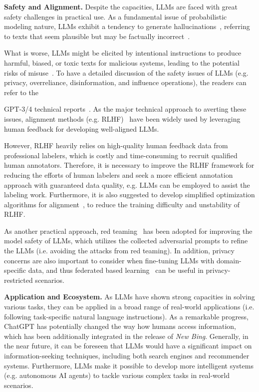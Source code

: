 \textbf{Safety and Alignment.} Despite the capacities, LLMs are faced with great safety challenges in practical use. As a fundamental issue of probabilistic modeling nature, LLMs exhibit a tendency to generate hallucinations~\cite{Bang-arxiv-2023-A}, referring to texts that seem plausible but may be factually incorrect~\cite{OpenAI-OpenAI-2023-GPT-4}.  

What is worse, LLMs might be elicited by intentional instructions to produce harmful, biased, or toxic texts for malicious systems, leading to the potential risks of misuse~\cite{Brown-NeurIPS-2020-Language,Ouyang-arxiv-2022-Training}. To have a detailed  discussion of the safety issues of LLMs (e.g. privacy, overreliance, disinformation, and influence operations), the readers can refer to the {GPT-3/4 technical reports~\cite{OpenAI-OpenAI-2023-GPT-4,Brown-NeurIPS-2020-Language}. As the major technical approach to averting these issues, alignment methods (e.g. RLHF)~\cite{Ouyang-arxiv-2022-Training,Glaese-arxiv-2022-Improving} have been widely used by leveraging human feedback for developing well-aligned LLMs.

However, RLHF heavily relies on high-quality human feedback data from professional labelers, which is costly and time-consuming to recruit qualified human annotators. Therefore, it is necessary to improve the RLHF framework for reducing the efforts of human labelers and seek a more efficient annotation approach with guaranteed data quality,  e.g. LLMs can be employed to assist the labeling work. Furthermore, it is also suggested to develop simplified optimization algorithms for alignment~\cite{Rafailov-arxiv-2023-Direct,Guo-arxiv-2023-Beyond}, to reduce   the training difficulty and unstability of RLHF. 

As another practical approach, red teaming~\cite{Ganguli-arxiv-2022-Red,Perez-EMNLP-2022-Red} has been adopted for improving the model safety of LLMs, which utilizes the collected adversarial prompts to refine the LLMs (i.e. avoiding the attacks from red teaming). In addition, privacy  concerns are also important to consider when fine-tuning LLMs with domain-specific data, and thus federated based learning~\cite{Kuang-2023-arxiv-FederatedScope} can be useful in privacy-restricted scenarios.   

\textbf{Application and Ecosystem.} As LLMs have shown strong capacities  in solving various tasks, they can be applied in a broad range of real-world applications (i.e. following task-specific natural language instructions). As a remarkable progress, ChatGPT has potentially changed the way how humans access information, which has been additionally integrated in  the release of \emph{New Bing}. Generally, in the near future, it can be foreseen that LLMs would have a significant impact on  information-seeking techniques, including both search engines and recommender systems. Furthermore, LLMs make it possible to develop more intelligent systems (e.g. autonomous AI agents) to tackle various complex tasks in real-world scenarios.  

}
